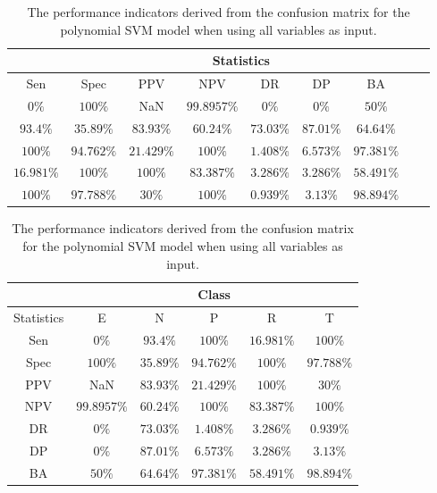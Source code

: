 \begin{table}[!ht]
	\centering
	\begin{tabular}{|c|c|c|c|c|c|c|c|c|}
		\hline
		 & \multicolumn{7}{c|}{Statistics} \\ \hline
		Sen & Spec & PPV & NPV & DR & DP & BA \\ \hline
		$0\%$ & $100\%$ & NaN & $99.8957\%$ & $0\%$ & $0\%$ & $50\%$ \\ \hline
		$93.4\%$ & $35.89\%$ & $83.93\%$ & $60.24\%$ & $73.03\%$ & $87.01\%$ & $64.64\%$ \\ \hline
		$100\%$ & $94.762\%$ & $21.429\%$ & $100\%$ & $1.408\%$ & $6.573\%$ & $97.381\%$ \\ \hline
		$16.981\%$ & $100\%$ & $100\%$ & $83.387\%$ & $3.286\%$ & $3.286\%$ & $58.491\%$ \\ \hline
		$100\%$ & $97.788\%$ & $30\%$ & $100\%$ & $0.939\%$ & $3.13\%$ & $98.894\%$ \\ \hline
	\end{tabular}
	\caption{The performance indicators derived from the confusion matrix for the polynomial SVM model when using all variables as input.}
	\label{tab:cs:all:svmPoly}
\end{table}

\begin{table}[!ht]
	\centering
	\begin{tabular}{|c|c|c|c|c|c|}
		\hline
		 & \multicolumn{5}{c|}{Class} \\ \hline
		Statistics & E & N & P & R & T \\ \hline
		Sen & $0\%$ & $93.4\%$ & $100\%$ & $16.981\%$ & $100\%$ \\ \hline
		Spec & $100\%$ & $35.89\%$ & $94.762\%$ & $100\%$ & $97.788\%$ \\ \hline
		PPV & NaN & $83.93\%$ & $21.429\%$ & $100\%$ & $30\%$ \\ \hline
		NPV & $99.8957\%$ & $60.24\%$ & $100\%$ & $83.387\%$ & $100\%$ \\ \hline
		DR & $0\%$ & $73.03\%$ & $1.408\%$ & $3.286\%$ & $0.939\%$ \\ \hline
		DP & $0\%$ & $87.01\%$ & $6.573\%$ & $3.286\%$ & $3.13\%$ \\ \hline
		BA & $50\%$ & $64.64\%$ & $97.381\%$ & $58.491\%$ & $98.894\%$ \\ \hline
	\end{tabular}
	\caption{The performance indicators derived from the confusion matrix for the polynomial SVM model when using all variables as input.}
	\label{tab:cs:reverse:all:svmPoly}
\end{table}

